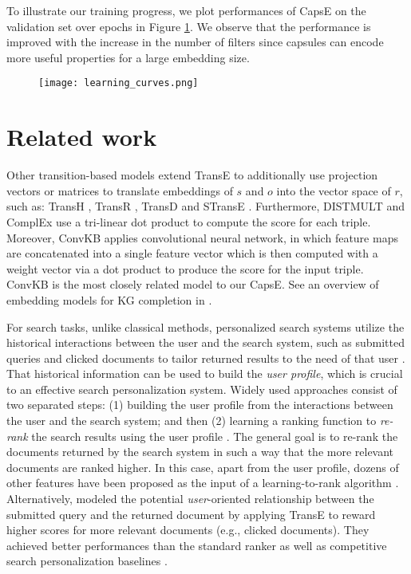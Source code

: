 \documentclass[11pt,a4paper]{article}
\begin{document}
To illustrate our training progress, we plot performances of CapsE on the validation set over epochs in Figure \ref{fig:learningcurves}. 
We observe that the performance is improved with the increase in the number of filters since capsules can encode more useful properties for a large embedding size.

\begin{figure}[!t]
\centering
\texttt{[image: learning\_curves.png]}
\label{fig:learningcurves}
\end{figure}

\section{Related work}



Other transition-based models extend TransE to additionally use projection vectors or matrices to translate embeddings of $s$ and $o$ into the vector space of $r$, such as: TransH \citep{AAAI148531}, TransR \citep{AAAI159571}, TransD \citep{ji-EtAl:2015:ACL-IJCNLP} and STransE \citep{NguyenNAACL2016}. 
Furthermore, DISTMULT \citep{Yang2015} and ComplEx \citep{Trouillon2016} use a tri-linear dot product to compute the score for each triple. 
Moreover, ConvKB \citep{Nguyen2018} applies convolutional neural network, in which 
feature maps are concatenated into a single feature vector which is then computed with a weight vector via a dot product to produce the score for the input triple. ConvKB is the most closely related model to our CapsE. See  an overview of embedding models for KG completion in \citep{Nguyen2017}.  


For search tasks, unlike classical methods, personalized search systems utilize the historical interactions  between the user and the search system, such as submitted queries and clicked documents to tailor returned  results to the need of that user \citep{Teevan2005,Teevan2009}. 
That historical information can be used to build the \emph{user profile}, which is crucial to an effective search personalization system. 
Widely used approaches consist of two separated steps: (1) building the user profile from the interactions between the user and the search system; and then (2) learning a ranking function to \emph{re-rank} the search results using the user profile \citep{Bennett2012,WhiteE2013,HarveyB2013,Vu2015}. 
The general goal is to re-rank the documents returned by the search system in such a way that the more relevant documents are ranked higher.
In this case, apart from the user profile, dozens of other features have been proposed as the input of a learning-to-rank algorithm \citep{Bennett2012,WhiteE2013}. 
Alternatively, \citet{vu2017search} modeled the potential  \textit{user}-oriented relationship between the submitted query and the returned document by applying TransE to reward higher scores for more relevant documents (e.g., clicked documents). They achieved better performances than the standard ranker as well as competitive search personalization baselines \citep{Teevan2011,Bennett2012,Vu2015}.
\end{document}

